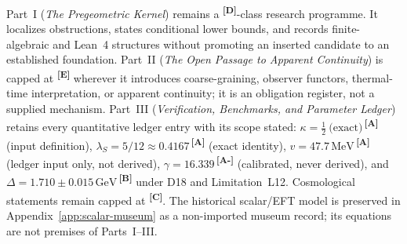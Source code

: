 \documentclass[12pt,a4paper,twoside]{article}
\theoremstyle{plain}
\theoremstyle{definition}
\theoremstyle{remark}
\newcommand{\GeV}{\,\mathrm{GeV}}
\newcommand{\MeV}{\,\mathrm{MeV}}
\newcommand{\catmark}[1]{\textsuperscript{\textsf{\textbf{[#1]}}}}
\newcommand{\lambdaS}{5/12 \approx 0.4167} %
\newcommand{\DeltaGap}{1.710 \pm 0.015\GeV} %
\newcommand{\GammaGeom}{16.339} %
\newcommand{\vVEV}{47.7\MeV} %
\newcommand{\KappaRG}{\tfrac{1}{2}\ \text{(exact)}} %
\begin{document}
\begin{evidencebox}{}
Part~I (\emph{The Pregeometric Kernel}) remains a \catmark{D}-class research
programme. It localizes obstructions, states conditional lower bounds, and
records finite-algebraic and Lean~4 structures without promoting an inserted
candidate to an established foundation. Part~II (\emph{The Open Passage to
Apparent Continuity}) is capped at \catmark{E} wherever it introduces
coarse-graining, observer functors, thermal-time interpretation, or apparent
continuity; it is an obligation register, not a supplied mechanism. Part~III
(\emph{Verification, Benchmarks, and Parameter Ledger}) retains every
quantitative ledger entry with its scope stated: $\kappa=\KappaRG$\,\catmark{A}
(input definition), $\lambda_S=\lambdaS$\,\catmark{A} (exact identity),
$v=\vVEV$\,\catmark{A} (ledger input only, not derived),
$\gamma=\GammaGeom$\,\catmark{A-} (calibrated, never derived), and
$\Delta=\DeltaGap$\,\catmark{B} under D18 and Limitation~L12. Cosmological
statements remain capped at \catmark{C}. The historical scalar/EFT model is
preserved in Appendix~\ref{app:scalar-museum} as a non-imported museum record;
its equations are not premises of Parts~I--III.
\end{evidencebox}

\newpage
\tableofcontents
\newpage
\end{document}
